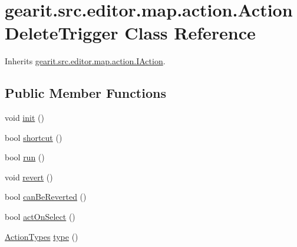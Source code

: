 \hypertarget{classgearit_1_1src_1_1editor_1_1map_1_1action_1_1_action_delete_trigger}{\section{gearit.\+src.\+editor.\+map.\+action.\+Action\+Delete\+Trigger Class Reference}
\label{classgearit_1_1src_1_1editor_1_1map_1_1action_1_1_action_delete_trigger}
}


Inherits \hyperlink{interfacegearit_1_1src_1_1editor_1_1map_1_1action_1_1_i_action}{gearit.\+src.\+editor.\+map.\+action.\+I\+Action}.

\subsection*{Public Member Functions}
\begin{DoxyCompactItemize}
\item 
void \hyperlink{classgearit_1_1src_1_1editor_1_1map_1_1action_1_1_action_delete_trigger_a39d26cce405b5c786bf384dc34c9ad32}{init} ()
\item 
bool \hyperlink{classgearit_1_1src_1_1editor_1_1map_1_1action_1_1_action_delete_trigger_a62e8ea9be25ba85ef82ae67a085f6ba4}{shortcut} ()
\item 
bool \hyperlink{classgearit_1_1src_1_1editor_1_1map_1_1action_1_1_action_delete_trigger_a16ff7087a8f37afd1ca0b0e1c7fa3d41}{run} ()
\item 
void \hyperlink{classgearit_1_1src_1_1editor_1_1map_1_1action_1_1_action_delete_trigger_aa8c23a19b5db8eac724cd13cf5291310}{revert} ()
\item 
bool \hyperlink{classgearit_1_1src_1_1editor_1_1map_1_1action_1_1_action_delete_trigger_a54409f9a09c2adac5663716b0061ff80}{can\+Be\+Reverted} ()
\item 
bool \hyperlink{classgearit_1_1src_1_1editor_1_1map_1_1action_1_1_action_delete_trigger_a4e1a6148154a44358230f264ed951d50}{act\+On\+Select} ()
\item 
\hyperlink{namespacegearit_1_1src_1_1editor_1_1map_1_1action_af036712a7d960b13d1e31954e65c00e3}{Action\+Types} \hyperlink{classgearit_1_1src_1_1editor_1_1map_1_1action_1_1_action_delete_trigger_ab32932faae225c8d1fd43613886d0b7d}{type} ()
\end{DoxyCompactItemize}


